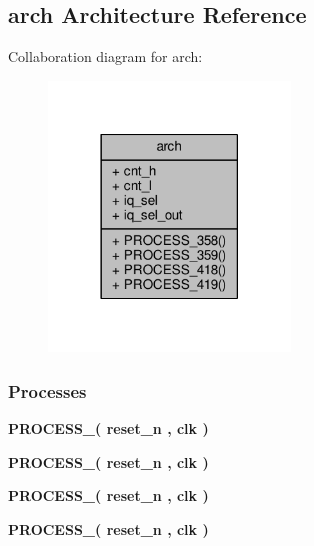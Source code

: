 \subsection{arch Architecture Reference}
\label{classtest__data__dd_1_1arch}


Collaboration diagram for arch\+:\nopagebreak
\begin{figure}[H]
\begin{center}
\leavevmode
\includegraphics[width=182pt]{dd/d45/classtest__data__dd_1_1arch__coll__graph}
\end{center}
\end{figure}
\subsubsection*{Processes}
 \begin{DoxyCompactItemize}
\item 
{\bf P\+R\+O\+C\+E\+S\+S\+\_}{\bfseries  ( {\bfseries {\bfseries {\bf reset\+\_\+n}} \textcolor{vhdlchar}{ }} , {\bfseries {\bfseries {\bf clk}} \textcolor{vhdlchar}{ }} )}
\item 
{\bf P\+R\+O\+C\+E\+S\+S\+\_}{\bfseries  ( {\bfseries {\bfseries {\bf reset\+\_\+n}} \textcolor{vhdlchar}{ }} , {\bfseries {\bfseries {\bf clk}} \textcolor{vhdlchar}{ }} )}
\item 
{\bf P\+R\+O\+C\+E\+S\+S\+\_}{\bfseries  ( {\bfseries {\bfseries {\bf reset\+\_\+n}} \textcolor{vhdlchar}{ }} , {\bfseries {\bfseries {\bf clk}} \textcolor{vhdlchar}{ }} )}
\item 
{\bf P\+R\+O\+C\+E\+S\+S\+\_}{\bfseries  ( {\bfseries {\bfseries {\bf reset\+\_\+n}} \textcolor{vhdlchar}{ }} , {\bfseries {\bfseries {\bf clk}} \textcolor{vhdlchar}{ }} )}
\end{DoxyCompactItemize}
